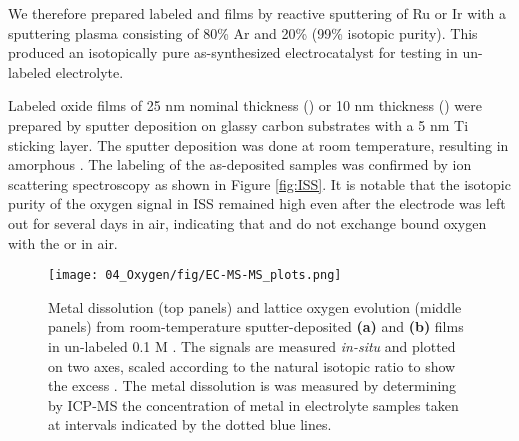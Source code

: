 We therefore prepared labeled  and  films by reactive sputtering of Ru or Ir with a sputtering plasma consisting of 80\% Ar and 20\%  (99\% isotopic purity). This produced an isotopically pure as-synthesized electrocatalyst for testing in un-labeled electrolyte.

Labeled oxide films of 25 nm nominal thickness () or 10 nm thickness () were prepared by sputter deposition on glassy carbon substrates with a 5 nm Ti sticking layer. The sputter deposition was done at room temperature, resulting in amorphous . The labeling of the as-deposited samples was confirmed by ion scattering spectroscopy as shown in Figure \ref{fig:ISS}. It is notable that the isotopic purity of the oxygen signal in ISS remained high even after the electrode was left out for several days in air, indicating that  and  do not exchange bound oxygen with the  or  in air.

\begin{figure}[h!]
	\texttt{[image: 04\_Oxygen/fig/EC-MS-MS\_plots.png]}
	\caption{Metal dissolution (top panels) and lattice oxygen evolution (middle panels) from room-temperature sputter-deposited \textbf{(a)}  and \textbf{(b)}  films in un-labeled 0.1 M . The  signals are measured \textit{in-situ} and plotted on two axes, scaled according to the natural isotopic ratio to show the excess . The metal dissolution is was measured by determining by ICP-MS the concentration of metal in electrolyte samples taken at intervals indicated by the dotted blue lines.} 
	\label{fig:EC-MS-MS_plots}
\end{figure}

